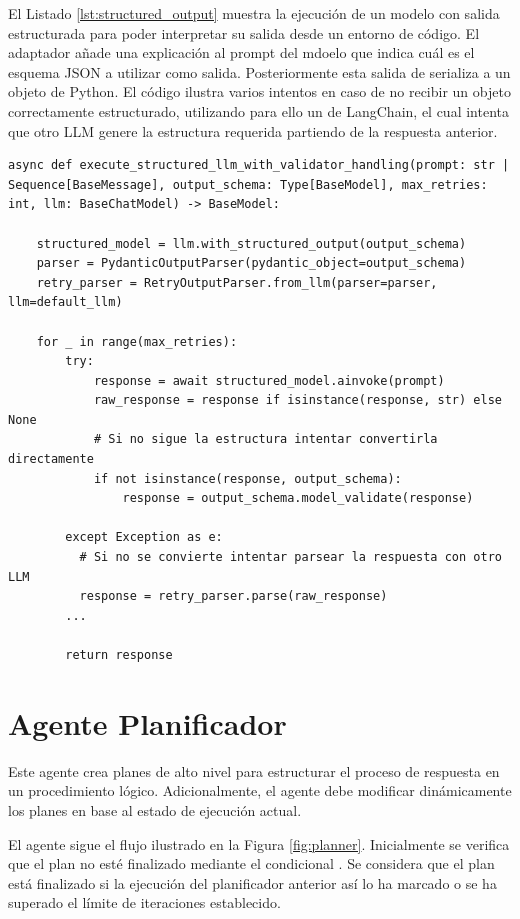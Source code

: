 El Listado \ref{lst:structured_output} muestra la ejecución de un modelo con salida estructurada para poder interpretar su salida desde un entorno de código. El adaptador  añade una explicación al prompt del mdoelo que indica cuál es el esquema JSON a utilizar como salida. Posteriormente esta salida de serializa a un objeto de Python. El código ilustra varios intentos en caso de no recibir un objeto correctamente estructurado, utilizando para ello un  de LangChain, el cual intenta que otro LLM genere la estructura requerida partiendo de la respuesta anterior. 

\begin{lstlisting}[caption={Validación de la salida estructurada de un LLM},label={lst:structured_output}]
  async def execute_structured_llm_with_validator_handling(prompt: str | Sequence[BaseMessage], output_schema: Type[BaseModel], max_retries: int, llm: BaseChatModel) -> BaseModel:

    structured_model = llm.with_structured_output(output_schema)
    parser = PydanticOutputParser(pydantic_object=output_schema)
    retry_parser = RetryOutputParser.from_llm(parser=parser, llm=default_llm)

    for _ in range(max_retries):
        try:
            response = await structured_model.ainvoke(prompt)
            raw_response = response if isinstance(response, str) else None
            # Si no sigue la estructura intentar convertirla directamente 
            if not isinstance(response, output_schema):
                response = output_schema.model_validate(response)

        except Exception as e:
          # Si no se convierte intentar parsear la respuesta con otro LLM  
          response = retry_parser.parse(raw_response)
        ...

        return response
\end{lstlisting}

\section{Agente Planificador}

Este agente crea planes de alto nivel para estructurar el proceso de respuesta en un procedimiento lógico. Adicionalmente, el agente debe modificar dinámicamente los planes en base al estado de ejecución actual.

El agente sigue el flujo ilustrado en la Figura \ref{fig:planner}. Inicialmente se verifica que el plan no esté finalizado mediante el condicional . Se considera que el plan está finalizado si la ejecución del planificador anterior así lo ha marcado o se ha superado el límite de iteraciones establecido.

